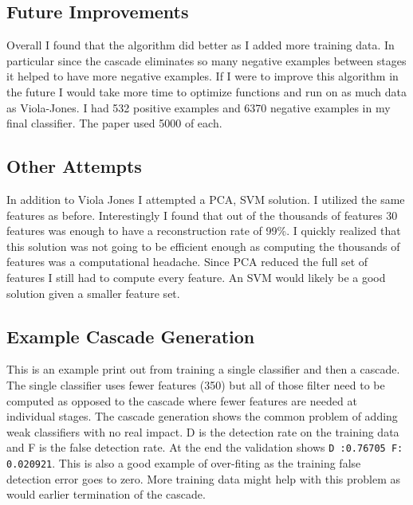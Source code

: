 \documentclass[letterpaper,12pt]{article}
\begin{document}
\subsection{Future Improvements}
Overall I found that the algorithm did better as I added more training data. In particular since the cascade eliminates so many negative examples between stages it helped to have more negative examples. If I were to improve this algorithm in the future I would take more time to optimize functions and run on as much data as Viola-Jones. I had 532 positive examples and 6370 negative examples in my final classifier. The paper used 5000 of each.

\subsection{Other Attempts}

In addition to Viola Jones I attempted a PCA, SVM solution. I utilized the same features as before. Interestingly I found that out of the thousands of features 30 features was enough to have a reconstruction rate of 99\%. I quickly realized that this solution was not going to be efficient enough as computing the thousands of features was a computational headache. Since PCA reduced the full set of features I still had to compute every feature. An SVM would likely be a good solution given a smaller feature set.

\subsection{Example Cascade Generation}

This is an example print out from training a single classifier and then a cascade. The single classifier uses fewer features (350) but all of those filter need to be computed as opposed to the cascade where fewer features are needed at individual stages. The cascade generation shows the common problem of adding weak classifiers with no real impact. D is the detection rate on the training data and F is the false detection rate. At the end the validation shows \texttt{D :0.76705 F: 0.020921}. This is also a good example of over-fiting as the training false detection error goes to zero. More training data might help with this problem as would earlier termination of the cascade.
\end{document}
